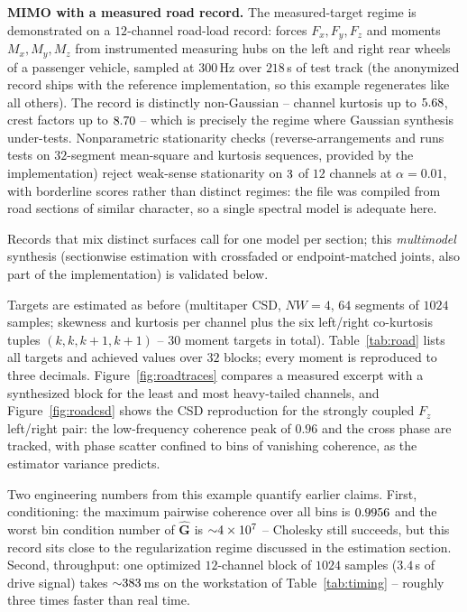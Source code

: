 \documentclass[10pt,a4paper]{article}
\numberwithin{equation}{section}
\begin{document}
\textbf{MIMO with a measured road record.} The measured-target regime is demonstrated on a $12$-channel road-load record: forces $F_x, F_y, F_z$ and moments $M_x, M_y, M_z$ from instrumented measuring hubs on the left and right rear wheels of a passenger vehicle, sampled at $300\,$Hz over $218\,$s of test track (the anonymized record ships with the reference implementation, so this example regenerates like all others). The record is distinctly non-Gaussian -- channel kurtosis up to $5.68$, crest factors up to $8.70$ -- which is precisely the regime where Gaussian synthesis under-tests. Nonparametric stationarity checks (reverse-arrangements and runs tests on $32$-segment mean-square and kurtosis sequences, provided by the implementation) reject weak-sense stationarity on $3$ of $12$ channels at $\alpha = 0.01$, with borderline scores rather than distinct regimes: the file was compiled from road sections of similar character, so a single spectral model is adequate here. 

Records that mix distinct surfaces call for one model per section; this \emph{multimodel} synthesis (sectionwise estimation with crossfaded or endpoint-matched joints, also part of the implementation) is validated below. 

Targets are estimated as before (multitaper CSD, $NW = 4$, $64$ segments of $1024$ samples; skewness and kurtosis per channel plus the six left/right co-kurtosis tuples $(k, k, k{+}1, k{+}1)$ -- $30$ moment targets in total). Table~\ref{tab:road} lists all targets and achieved values over $32$ blocks; every moment is reproduced to three decimals. Figure~\ref{fig:roadtraces} compares a measured excerpt with a synthesized block for the least and most heavy-tailed channels, and Figure~\ref{fig:roadcsd} shows the CSD reproduction for the strongly coupled $F_z$ left/right pair: the low-frequency coherence peak of $0.96$ and the cross phase are tracked, with phase scatter confined to bins of vanishing coherence, as the estimator variance predicts.

Two engineering numbers from this example quantify earlier claims. First, conditioning: the maximum pairwise coherence over all bins is $0.9956$ and the worst bin condition number of $\hat{\mathbf{G}}$ is ${\sim}4 \times 10^{7}$ -- Cholesky still succeeds, but this record sits close to the regularization regime discussed in the estimation section. Second, throughput: one optimized $12$-channel block of $1024$ samples ($3.4\,$s of drive signal) takes ${\sim}383\,$ms on the workstation of Table~\ref{tab:timing} -- roughly three times faster than real time.
\end{document}
